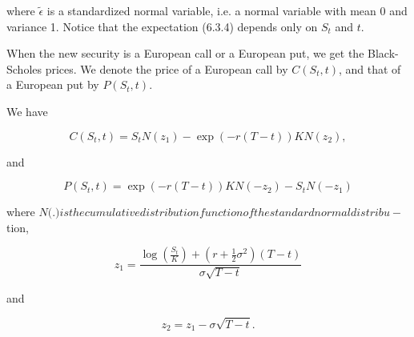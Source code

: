 \documentclass[\topdir/lecture\_notes.tex]{subfiles}
\begin{document}
where \(\tilde{\epsilon}\) is a standardized normal variable, i.e. a normal variable with mean 0 and variance 1. Notice that the expectation (6.3.4) depends only on \(S_{t}\) and \(t\).

When the new security is a European call or a European put, we get the Black-Scholes prices. We denote the price of a European call by \(C\left(S_{t}, t\right)\), and that of a European put by \(P\left(S_{t}, t\right)\).

\begin{proposition}\label{prop:black_scholes_formulas}
We have

\begin{equation}
C\left(S_{t}, t\right)=S_{t} N\left(z_{1}\right)-\exp (-r(T-t)) K N\left(z_{2}\right), \label{eq:black_scholes_call}
\end{equation}

and

\begin{equation*}
P\left(S_{t}, t\right)=\exp (-r(T-t)) K N\left(-z_{2}\right)-S_{t} N\left(-z_{1}\right)
\end{equation*}

where \(N(\).\() is the cumulative distribution function of the standard normal distribu-\) tion,

\begin{equation*}
z_{1}=\frac{\log \left(\frac{S_{t}}{K}\right)+\left(r+\frac{1}{2} \sigma^{2}\right)(T-t)}{\sigma \sqrt{T-t}}
\end{equation*}

and

\begin{equation*}
z_{2}=z_{1}-\sigma \sqrt{T-t} .
\end{equation*}
\end{proposition}
\end{document}
